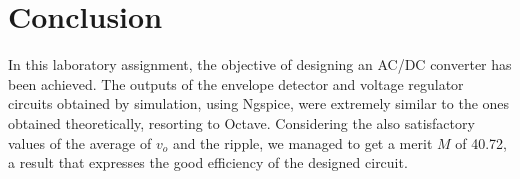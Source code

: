 \section{Conclusion}
\label{sec:conclusion}

In this laboratory assignment, the objective of designing an AC/DC converter has been achieved. The outputs of the envelope detector and voltage regulator circuits obtained by simulation, using Ngspice, were extremely similar to the ones obtained theoretically, resorting to Octave. Considering the also satisfactory values of the average of $v_o$ and the ripple, we managed to get a merit $M$ of 40.72, a result that expresses the good efficiency of the designed circuit.
